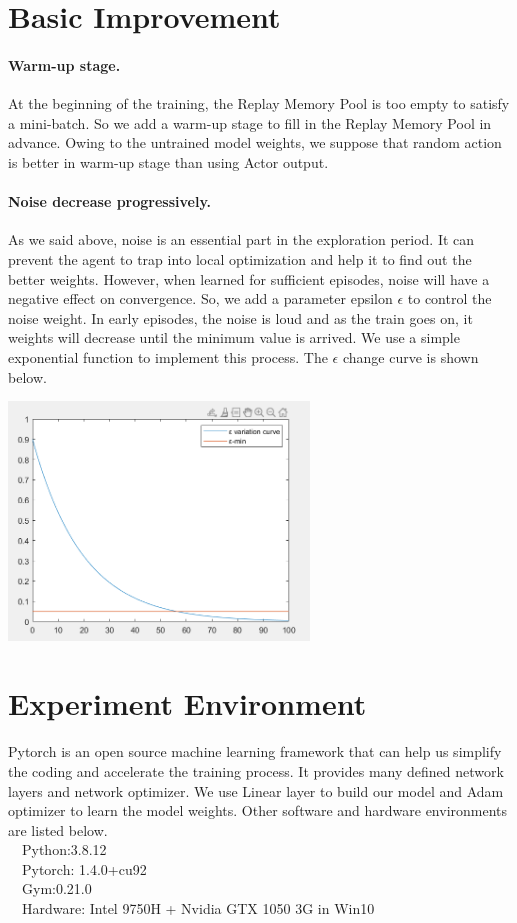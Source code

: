 \documentclass[a4paper,12pt,oneside,article]{memoir}
\newcommand{\mybold}[1]{\paragraph{#1.}} %
\begin{document}
\section{Basic Improvement}
\mybold{Warm-up stage}At the beginning of the training, the Replay Memory Pool is too empty to satisfy a mini-batch. So we add a warm-up stage to fill in the Replay Memory Pool in advance. Owing to the untrained model weights, we suppose that random action is better in warm-up stage than using Actor output.
\mybold{Noise decrease progressively}As we said above, noise is an essential part in the exploration period. It can prevent the agent to trap into local optimization and help it to find out the better weights. However, when learned for sufficient episodes, noise will have a negative effect on convergence. So, we add a parameter epsilon $\epsilon$ to control the noise weight. In early episodes, the noise is loud and as the train goes on, it weights will decrease until the minimum value is arrived. We use a simple exponential function to implement this process. The $\epsilon$ change curve is shown below.

\begin{center}
\includegraphics[width=8cm]{epsilon.png}
\label{fig:smiley}
\end{center}

\section{Experiment Environment}
Pytorch is an open source machine learning framework that can help us simplify the coding and accelerate the training process. It provides many defined network layers and network optimizer. We use Linear layer to build our model and Adam optimizer to learn the model weights. Other software and hardware environments are listed below.
\\\ \ Python:3.8.12
\\\ \ Pytorch: 1.4.0+cu92
\\\ \ Gym:0.21.0
\\\ \ Hardware: Intel 9750H + Nvidia GTX 1050 3G in Win10
\end{document}
